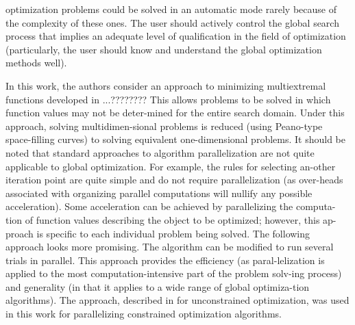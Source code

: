 \documentclass[runningheads]{llncs}
\begin{document}
optimization problems could be solved in an automatic mode rarely because of the
complexity of these ones. The user should actively control the global search
process that implies an adequate level of qualification in the field of optimization
(particularly, the user should know and understand the global optimization methods well).
\par
In this work, the authors consider an approach to minimizing multiextremal functions  developed in ...????????
This allows problems to be solved in which function values may not be deter-mined for the entire search domain. Under this approach, solving multidimen-sional problems is reduced (using Peano-type space-filling curves) to solving equivalent one-dimensional problems.
It should be noted that standard approaches to algorithm parallelization are not quite applicable to global optimization. For example, the rules for selecting an-other iteration point are quite simple and do not require parallelization (as over-heads associated with organizing parallel computations will nullify any possible acceleration). Some acceleration can be achieved by parallelizing the computa-tion of function values describing the object to be optimized; however, this ap-proach is specific to each individual problem being solved.
The following approach looks more promising. The algorithm can be modified to run several trials in parallel. This approach provides the efficiency (as paral-lelization is applied to the most computation-intensive part of the problem solv-ing process) and generality (in that it applies to a wide range of global optimiza-tion algorithms). The approach, described in  \cite{Two_Level_Parallel} for unconstrained optimization, was used in this work for parallelizing constrained optimization algorithms.
\end{document}
